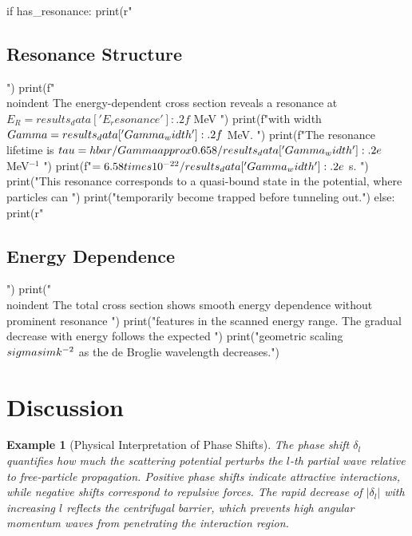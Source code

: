 \documentclass[a4paper, 11pt]{article}
\newtheorem{example}{Example}[section]
\begin{document}
\begin{pycode}
if has_resonance:
    print(r"\subsection{Resonance Structure}")
    print(f"\\noindent The energy-dependent cross section reveals a resonance at $E_R = {results_data['E_resonance']:.2f}$ MeV ")
    print(f"with width $\\Gamma = {results_data['Gamma_width']:.2f}$ MeV. ")
    print(f"The resonance lifetime is $\\tau = \\hbar/\\Gamma \\approx {0.658/results_data['Gamma_width']:.2e}$ MeV$^{{-1}}$ ")
    print(f"$= {6.58\\times 10^{{-22}}/results_data['Gamma_width']:.2e}$ s. ")
    print("This resonance corresponds to a quasi-bound state in the potential, where particles can ")
    print("temporarily become trapped before tunneling out.")
else:
    print(r"\subsection{Energy Dependence}")
    print("\\noindent The total cross section shows smooth energy dependence without prominent resonance ")
    print("features in the scanned energy range. The gradual decrease with energy follows the expected ")
    print("geometric scaling $\\sigma \\sim k^{-2}$ as the de Broglie wavelength decreases.")
\end{pycode}

\section{Discussion}

\begin{example}[Physical Interpretation of Phase Shifts]
The phase shift $\delta_l$ quantifies how much the scattering potential perturbs the $l$-th
partial wave relative to free-particle propagation. Positive phase shifts indicate attractive
interactions, while negative shifts correspond to repulsive forces. The rapid decrease of
$|\delta_l|$ with increasing $l$ reflects the centrifugal barrier, which prevents high angular
momentum waves from penetrating the interaction region.
\end{example}
\end{document}
